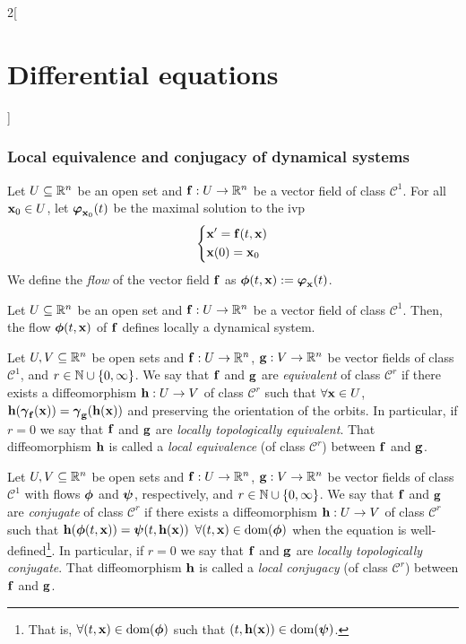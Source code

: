 \documentclass[../../../main.tex]{subfiles}
\begin{document}
\begin{multicols}{2}[\section{Differential equations}]
  \subsubsection{Local equivalence and conjugacy of dynamical systems}
  \begin{definition}
    Let $U\subseteq \mathbb{R}^n$ be an open set and $\boldsymbol{\mathrm{f}}:U\rightarrow\mathbb{R}^n$ be a vector field of class $\mathcal{C}^1$. For all $\boldsymbol{\mathrm{x}}_0\in U$, let $\boldsymbol{\mathrm{\varphi}}_{\boldsymbol{\mathrm{x}}_0}(t)$ be the maximal solution to the ivp
    $$\left\{
      \begin{aligned}
         & \boldsymbol{\mathrm{x}}'      =\boldsymbol{\mathrm{f}}(t,\boldsymbol{\mathrm{x}}) \\
         & \boldsymbol{\mathrm{x}}(0)  =\boldsymbol{\mathrm{x}}_0
      \end{aligned}
      \right.$$
    We define the \emph{flow} of the vector field $\boldsymbol{\mathrm{f}}$ as $\boldsymbol{\mathrm{\phi}}(t,\boldsymbol{\mathrm{x}}):=\boldsymbol{\mathrm{\varphi}}_{\boldsymbol{\mathrm{x}}}(t)$.
  \end{definition}
  \begin{prop}
    Let $U\subseteq \mathbb{R}^n$ be an open set and $\boldsymbol{\mathrm{f}}:U\rightarrow\mathbb{R}^n$ be a vector field of class $\mathcal{C}^1$. Then, the flow $\boldsymbol{\mathrm{\phi}}(t,\boldsymbol{\mathrm{x}})$ of $\boldsymbol{\mathrm{f}}$ defines locally a dynamical system.
  \end{prop}
  \begin{definition}
    Let $U,V\subseteq \mathbb{R}^n$ be open sets and $\boldsymbol{\mathrm{f}}:U\rightarrow\mathbb{R}^n$, $\boldsymbol{\mathrm{g}}:V\rightarrow\mathbb{R}^n$ be vector fields of class $\mathcal{C}^1$, and $r\in\mathbb{N}\cup\{0,\infty\}$. We say that $\boldsymbol{\mathrm{f}}$ and $\boldsymbol{\mathrm{g}}$ are \emph{equivalent} of class $\mathcal{C}^r$ if there exists a diffeomorphism $\boldsymbol{\mathrm{h}}:U\rightarrow V$ of class $\mathcal{C}^r$ such that $\forall \boldsymbol{\mathrm{x}}\in U$, $\boldsymbol{\mathrm{h}}(\boldsymbol{\mathrm{\gamma}}_{\boldsymbol{\mathrm{f}}}(\boldsymbol{\mathrm{x}}))=\boldsymbol{\mathrm{\gamma}}_{\boldsymbol{\mathrm{g}}}(\boldsymbol{\mathrm{h}}(\boldsymbol{\mathrm{x}}))$ and preserving the orientation of the orbits. In particular, if $r=0$ we say that $\boldsymbol{\mathrm{f}}$ and $\boldsymbol{\mathrm{g}}$ are \emph{locally topologically equivalent}. That diffeomorphism $\boldsymbol{\mathrm{h}}$ is called a \emph{local equivalence} (of class $\mathcal{C}^r$) between $\boldsymbol{\mathrm{f}}$ and $\boldsymbol{\mathrm{g}}$.
  \end{definition}
  \begin{definition}
    Let $U,V\subseteq \mathbb{R}^n$ be open sets and $\boldsymbol{\mathrm{f}}:U\rightarrow\mathbb{R}^n$, $\boldsymbol{\mathrm{g}}:V\rightarrow\mathbb{R}^n$ be vector fields of class $\mathcal{C}^1$ with flows $\boldsymbol{\mathrm{\phi}}$ and $\boldsymbol{\mathrm{\psi}}$, respectively, and $r\in\mathbb{N}\cup\{0,\infty\}$. We say that $\boldsymbol{\mathrm{f}}$ and $\boldsymbol{\mathrm{g}}$ are \emph{conjugate} of class $\mathcal{C}^r$ if there exists a diffeomorphism $\boldsymbol{\mathrm{h}}:U\rightarrow V$ of class $\mathcal{C}^r$ such that $\boldsymbol{\mathrm{h}}(\boldsymbol{\mathrm{\phi}}(t,\boldsymbol{\mathrm{x}}))=\boldsymbol{\mathrm{\psi}}(t,\boldsymbol{\mathrm{h}}(\boldsymbol{\mathrm{x}}))$ $\forall(t,\boldsymbol{\mathrm{x}})\in \operatorname{dom}(\boldsymbol{\mathrm{\phi}})$ when the equation is well-defined\footnote{That is, $\forall(t,\boldsymbol{\mathrm{x}})\in \operatorname{dom}(\boldsymbol{\mathrm{\phi}})$ such that $(t,\boldsymbol{\mathrm{h}}(\boldsymbol{\mathrm{x}}))\in \operatorname{dom}(\boldsymbol{\mathrm{\psi}})$.}. In particular, if $r=0$ we say that $\boldsymbol{\mathrm{f}}$ and $\boldsymbol{\mathrm{g}}$ are \emph{locally topologically conjugate}. That diffeomorphism $\boldsymbol{\mathrm{h}}$ is called a \emph{local conjugacy} (of class $\mathcal{C}^r$) between $\boldsymbol{\mathrm{f}}$ and $\boldsymbol{\mathrm{g}}$.

\end{definition}
\end{multicols}
\end{document}
